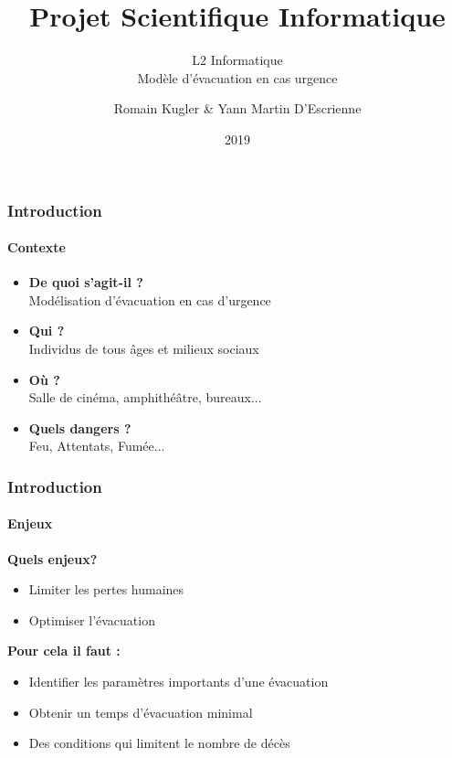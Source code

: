 \documentclass[10pt]{beamer}
\begin{document}
\title{\huge Projet Scientifique Informatique}
	\subtitle{\Large L2 Informatique \\
	Modèle d'évacuation en cas urgence  }
	\author {Romain Kugler \& Yann Martin D'Escrienne}
	\date{2019}
	
\begin{frame} \titlepage \end{frame}

\begin{frame}
	\frametitle{\textbf {\Large Introduction}}
	\framesubtitle{\large Contexte}
	
	\begin{block}{}
	\begin{itemize}
		\item \textbf{De quoi s'agit-il ?} \\
		Modélisation d'évacuation en cas d'urgence\\
		\item \textbf{Qui ?}\\
		Individus de tous âges et milieux sociaux \\
		\item \textbf{Où ?}\\
		Salle de cinéma, amphithéâtre, bureaux...\\
		\item \textbf{Quels dangers ?}\\
		Feu, Attentats, Fumée...
	\end{itemize}
	\end{block}	
\end{frame}



\begin{frame}
	\frametitle{\textbf {\Large Introduction}}
	\framesubtitle{\large Enjeux}
	
	\begin{block}{\textbf{Quels enjeux?}}
	\begin{itemize}
		\item Limiter les pertes humaines
		\item Optimiser l'évacuation 	
	\end{itemize}
	\end{block}
	
	\medskip
	
	\begin{block}{\textbf{Pour cela il faut :}}
	\begin{itemize}
		\medskip
		\item Identifier les paramètres importants d'une évacuation
		\smallskip 
		\item Obtenir un temps d'évacuation minimal\\
		\smallskip 
		\item Des conditions qui limitent le nombre de décès
	\end{itemize}
	\end{block}
	
	
\end{frame}
\end{document}
